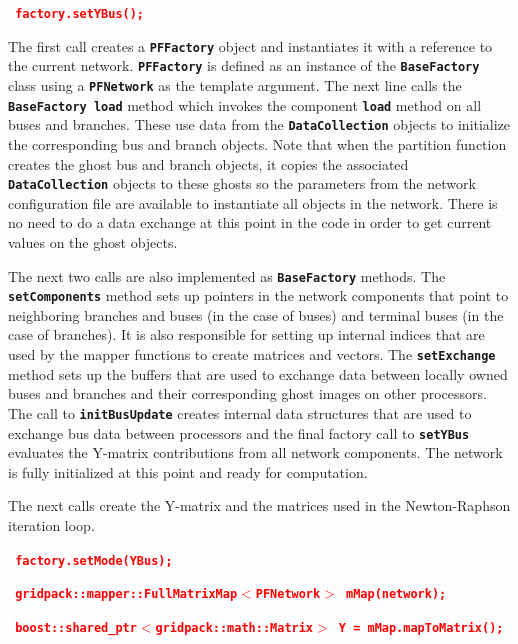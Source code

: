 \documentclass[12pt]{report} %
\begin{document}
\textcolor{red}{\texttt{\textbf{}}}

\textcolor{red}{\texttt{\textbf{  factory.setYBus();}}}

The first call creates a \texttt{\textbf{PFFactory}} object and instantiates it with a reference to the current network. \texttt{\textbf{PFFactory}} is defined as an instance of the \texttt{\textbf{BaseFactory}} class using a \texttt{\textbf{PFNetwork}} as the template argument. The next line calls the \texttt{\textbf{BaseFactory load}} method which invokes the component \texttt{\textbf{load}} method on all buses and branches. These use data from the \texttt{\textbf{DataCollection}} objects to initialize the corresponding bus and branch objects. Note that when the partition function creates the ghost bus and branch objects, it copies the associated \texttt{\textbf{DataCollection}} objects to these ghosts so the parameters from the network configuration file are available to instantiate all objects in the network. There is no need to do a data exchange at this point in the code in order to get current values on the ghost objects.

The next two calls are also implemented as \texttt{\textbf{BaseFactory}} methods. The \texttt{\textbf{setComponents}} method sets up pointers in the network components that point to neighboring branches and buses (in the case of buses) and terminal buses (in the case of branches). It is also responsible for setting up internal indices that are used by the mapper functions to create matrices and vectors. The \texttt{\textbf{setExchange}} method sets up the buffers that are used to exchange data between locally owned buses and branches and their corresponding ghost images on other processors. The call to \texttt{\textbf{initBusUpdate}} creates internal data structures that are used to exchange bus data between processors and the final factory call to \texttt{\textbf{setYBus}} evaluates the Y-matrix contributions from all network components. The network is fully initialized at this point and ready for computation.

The next calls create the Y-matrix and the matrices used in the Newton-Raphson iteration loop.

\textcolor{red}{\texttt{\textbf{  factory.setMode(YBus);}}}

\textcolor{red}{\texttt{\textbf{  gridpack::mapper::FullMatrixMap$\boldsymbol{\mathrm{<}}$PFNetwork$\boldsymbol{\mathrm{>}}$ mMap(network);}}}

\textcolor{red}{\texttt{\textbf{  boost::shared\_ptr$\boldsymbol{\mathrm{<}}$gridpack::math::Matrix$\boldsymbol{\mathrm{>}}$ Y = mMap.mapToMatrix();}}}
\end{document}

